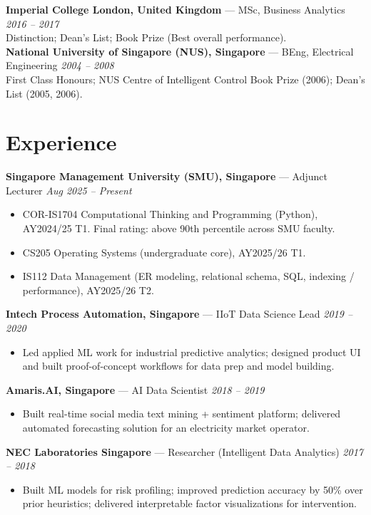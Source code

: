 \documentclass[10pt,a4paper]{article}
\newcommand{\role}[3]{\textbf{#1} --- #2 \hfill \textit{#3}\\}
\begin{document}
\role{Imperial College London, United Kingdom}{MSc, Business Analytics}{2016 -- 2017}
Distinction; Dean's List; Book Prize (Best overall performance).\\

\role{National University of Singapore (NUS), Singapore}{BEng, Electrical Engineering}{2004 -- 2008}
First Class Honours; NUS Centre of Intelligent Control Book Prize (2006); Dean's List (2005, 2006).\\

\section*{Experience}
\role{Singapore Management University (SMU), Singapore}{Adjunct Lecturer}{Aug 2025 -- Present}
\begin{itemize}
  \item COR-IS1704 Computational Thinking and Programming (Python), AY2024/25 T1. Final rating: above 90th percentile across SMU faculty.
  \item CS205 Operating Systems (undergraduate core), AY2025/26 T1.
  \item IS112 Data Management (ER modeling, relational schema, SQL, indexing / performance), AY2025/26 T2.
\end{itemize}

\role{Intech Process Automation, Singapore}{IIoT Data Science Lead}{2019 -- 2020}
\begin{itemize}
  \item Led applied ML work for industrial predictive analytics; designed product UI and built proof-of-concept workflows for data prep and model building.
\end{itemize}

\role{Amaris.AI, Singapore}{AI Data Scientist}{2018 -- 2019}
\begin{itemize}
  \item Built real-time social media text mining + sentiment platform; delivered automated forecasting solution for an electricity market operator.
\end{itemize}

\role{NEC Laboratories Singapore}{Researcher (Intelligent Data Analytics)}{2017 -- 2018}
\begin{itemize}
  \item Built ML models for risk profiling; improved prediction accuracy by 50\% over prior heuristics; delivered interpretable factor visualizations for intervention.
\end{itemize}
\end{document}
